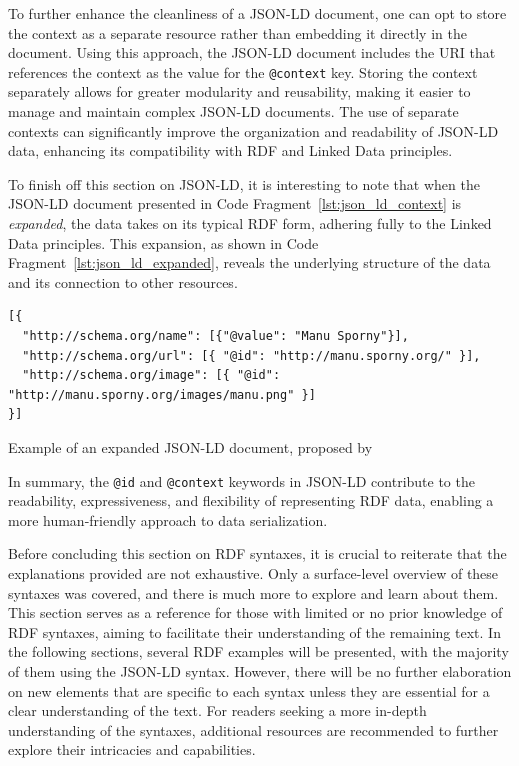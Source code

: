 \begin{itemize}
    To further enhance the cleanliness of a JSON-LD document, one can opt to store the context as a separate resource rather than embedding it directly in the document. Using this approach, the JSON-LD document includes the URI that references the context as the value for the \texttt{@context} key. Storing the context separately allows for greater modularity and reusability, making it easier to manage and maintain complex JSON-LD documents. The use of separate contexts can significantly improve the organization and readability of JSON-LD data, enhancing its compatibility with RDF and Linked Data principles. \citep{kellogg2020jsonld}

    To finish off this section on JSON-LD, it is interesting to note that when the JSON-LD document presented in Code Fragment~\ref{lst:json_ld_context} is \textit{expanded}, the data takes on its typical RDF form, adhering fully to the Linked Data principles. This expansion, as shown in Code Fragment~\ref{lst:json_ld_expanded}, reveals the underlying structure of the data and its connection to other resources. \citep{kellogg2020jsonld}

    \begin{listing}[htbp]
        \begin{verbatim}
[{
  "http://schema.org/name": [{"@value": "Manu Sporny"}],
  "http://schema.org/url": [{ "@id": "http://manu.sporny.org/" }],
  "http://schema.org/image": [{ "@id": "http://manu.sporny.org/images/manu.png" }]
}]
        \end{verbatim}
        \caption{Example of an expanded JSON-LD document, proposed by \cite{kellogg2020jsonld}}
        \label{lst:json_ld_expanded}
    \end{listing}

    In summary, the \texttt{@id} and \texttt{@context} keywords in JSON-LD contribute to the readability, expressiveness, and flexibility of representing RDF data, enabling a more human-friendly approach to data serialization.
    
\end{itemize}

Before concluding this section on RDF syntaxes, it is crucial to reiterate that the explanations provided are not exhaustive. Only a surface-level overview of these syntaxes was covered, and there is much more to explore and learn about them. This section serves as a reference for those with limited or no prior knowledge of RDF syntaxes, aiming to facilitate their understanding of the remaining text. In the following sections, several RDF examples will be presented, with the majority of them using the JSON-LD syntax. However, there will be no further elaboration on new elements that are specific to each syntax unless they are essential for a clear understanding of the text. For readers seeking a more in-depth understanding of the syntaxes, additional resources are recommended to further explore their intricacies and capabilities.

